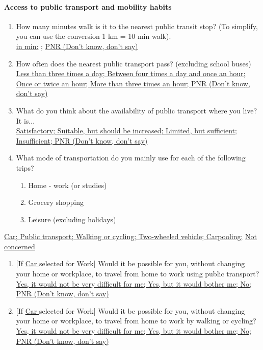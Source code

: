 \documentclass[english,5p,authoryear]{elsarticle}
\begin{document}
\begin{appendices}
\paragraph{Access to public transport and mobility habits}
\begin{enumerate}[resume,leftmargin=*]
\item How many minutes walk is it to the nearest public transit stop? (To
simplify, you can use the conversion 1 km = 10 min walk). \uline{}\\
\uline{in min:} ; \uline{PNR (Don't know, don't say) }
\item How often does the nearest public transport pass? (excluding school
buses) \uline{}\\
\uline{Less than three times a day; Between four times a day and once
an hour; Once or twice an hour; More than three times an hour; PNR
(Don't know, don't say) }
\item What do you think about the availability of public transport where
you live? It is... \uline{}\\
\uline{Satisfactory; Suitable, but should be increased; Limited, but
sufficient; Insufficient; PNR (Don't know, don't say) }
\item What mode of transportation do you mainly use for each of the following
trips?
\begin{enumerate}[resume,leftmargin=*]
\item Home - work (or studies) 
\item Grocery shopping 
\item Leisure (excluding holidays) 
\end{enumerate}
\end{enumerate}
\uline{Car; Public transport; Walking or cycling; Two-wheeled vehicle;
Carpooling;} \uline{Not concerned} 
\begin{enumerate}[resume,leftmargin=*]
\item {[}If \uline{Car }selected for Work{]} Would it be possible for you,
without changing your home or workplace, to travel from home to work
using public transport? \uline{}\\
\uline{Yes, it would not be very difficult for me; Yes, but it would
bother me; No; PNR (Don't know, don't say) }
\item {[}If \uline{Car }selected for Work{]} Would it be possible for you,
without changing your home or workplace, to travel from home to work
by walking or cycling? \uline{}\\
\uline{Yes, it would not be very difficult for me; Yes, but it would
bother me; No; PNR (Don't know, don't say) }
\end{enumerate}


\end{appendices}
\end{document}
